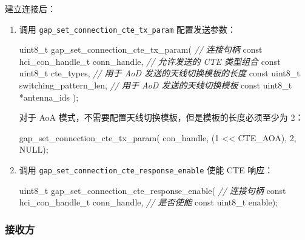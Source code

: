\documentclass[
  12pt,
]{book}
\newenvironment{Shaded}{\begin{snugshade}}{\end{snugshade}}
\newcommand{\CommentTok}[1]{\textcolor[rgb]{0.56,0.35,0.01}{\textit{#1}}}
\newcommand{\DataTypeTok}[1]{\textcolor[rgb]{0.13,0.29,0.53}{#1}}
\newcommand{\DecValTok}[1]{\textcolor[rgb]{0.00,0.00,0.81}{#1}}
\newcommand{\NormalTok}[1]{#1}
\begin{document}
建立连接后：

\begin{enumerate}
\def\labelenumi{\arabic{enumi}.}
\item
  调用 \texttt{gap\_set\_connection\_cte\_tx\_param} 配置发送参数：

\begin{Shaded}
\begin{Highlighting}[]
\DataTypeTok{uint8_t}\NormalTok{ gap_set_connection_cte_tx_param(}
  \CommentTok{// 连接句柄}
  \DataTypeTok{const}\NormalTok{ hci_con_handle_t  conn_handle,}
  \CommentTok{// 允许发送的 CTE 类型组合}
  \DataTypeTok{const} \DataTypeTok{uint8_t}\NormalTok{           cte_types,}
  \CommentTok{// 用于 AoD 发送的天线切换模板的长度}
  \DataTypeTok{const} \DataTypeTok{uint8_t}\NormalTok{           switching_pattern_len,}
  \CommentTok{// 用于 AoD 发送的天线切换模板}
  \DataTypeTok{const} \DataTypeTok{uint8_t}\NormalTok{          *antenna_ids}
\NormalTok{);}
\end{Highlighting}
\end{Shaded}

  对于 AoA 模式，不需要配置天线切换模板，但是模板的长度必须至少为 \(2\)：

\begin{Shaded}
\begin{Highlighting}[]
\NormalTok{gap_set_connection_cte_tx_param(}
\NormalTok{  con_handle, (}\DecValTok{1}\NormalTok{ << CTE_AOA), }\DecValTok{2}\NormalTok{, NULL);}
\end{Highlighting}
\end{Shaded}
\item
  调用 \texttt{gap\_set\_connection\_cte\_response\_enable} 使能 CTE 响应：

\begin{Shaded}
\begin{Highlighting}[]
\DataTypeTok{uint8_t}\NormalTok{ gap_set_connection_cte_response_enable(}
  \CommentTok{// 连接句柄}
  \DataTypeTok{const}\NormalTok{ hci_con_handle_t  conn_handle,}
  \CommentTok{// 是否使能}
  \DataTypeTok{const} \DataTypeTok{uint8_t}\NormalTok{           enable);}
\end{Highlighting}
\end{Shaded}
\end{enumerate}

\hypertarget{ux63a5ux6536ux65b9}{%
\subsubsection{接收方}\label{ux63a5ux6536ux65b9}}
\end{document}
